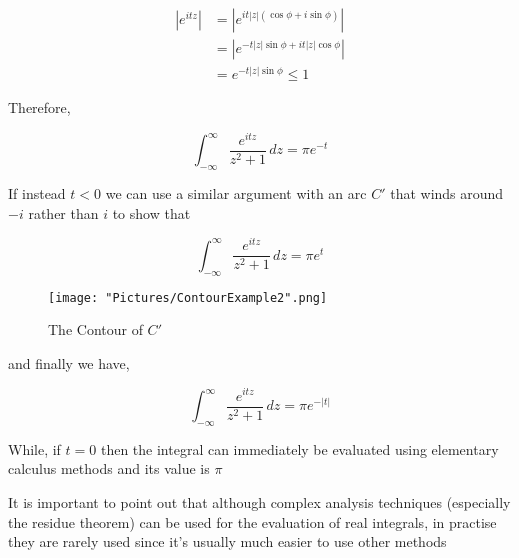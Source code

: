 \documentclass[12pt, letterpaper]{article}
\begin{document}
\begin{align*}
\left|e^{itz}\right| &=\left|e^{it|z|(\cos\phi + i\sin\phi)}\right| \\ &=\left|e^{-t|z|\sin\phi + it|z|\cos\phi}\right| \\
&=e^{-t|z|\sin\phi} \le 1 
\end{align*}

\noindent
Therefore,

\[ \int_{-\infty}^\infty \frac{e^{itz}}{z^2+1}\,dz=\pi e^{-t} \]
\bigskip

\noindent
If instead \(t < 0\) we can use a similar argument with an arc \(C'\) that winds around \(-i\) rather than \(i\) to show that 

\[ \int_{-\infty}^\infty\frac{e^{itz}}{z^2+1}\,dz=\pi e^t \]

\begin{figure}[h]
    \centering
    \texttt{[image: "Pictures/ContourExample2".png]}
    \caption{The Contour of \( C'\)}
    \label{fig:my_label6}
\end{figure}

\noindent
and finally we have,

\[ \int_{-\infty}^\infty\frac{e^{itz}}{z^2+1}\,dz=\pi e^{-\left|t\right|} \]
\bigskip

\noindent
While, if \(t = 0 \) then the integral can immediately be evaluated using elementary calculus methods and its value is \( \pi \)
\bigskip
\bigskip

\noindent
It is important to point out that although complex analysis techniques (especially the residue theorem) can be used for the evaluation of real integrals, in practise they are rarely used since it's usually much easier to use other methods
\end{document}
